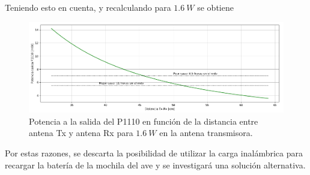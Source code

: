 Teniendo esto en cuenta, y recalculando para $1.6 \ W$ se obtiene

\begin{figure}[H]
	\centering
	\includegraphics[width=\linewidth]{ImagenesFactibilidad/recalculo}
	\caption{Potencia a la salida del P1110 en función de la distancia entre antena Tx y antena Rx para $1.6 \ W$ en la antena transmisora.}
	\label{fig:recalculo}
\end{figure}

Por estas razones, se descarta la posibilidad de utilizar la carga inalámbrica para recargar la batería de la mochila del ave y se investigará una solución alternativa.